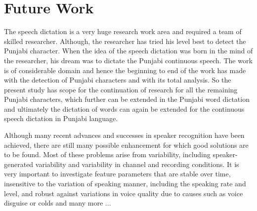 \documentclass[12pt,a4paper,oldfontcommands]{memoir}
\begin{document}
\section{Future Work}

The speech dictation is a very huge research work area and required a team of skilled
researcher. Although, the researcher has tried his level best to detect the Punjabi
character. When the idea of the speech dictation was born in the mind of the
researcher, his dream was to dictate the Punjabi continuous speech. The work is of
considerable domain and hence the beginning to end of the work has made with the
detection of Punjabi characters and with its total analysis. So the present study has scope for the
continuation of research for all the remaining Punjabi characters, which further can
be extended in the Punjabi word dictation and ultimately the dictation of words can
again be extended for the continuous speech dictation in Punjabi language.

Although many recent advances and successes in speaker recognition have been
achieved, there are still many possible enhancement for which good solutions are to
be found. Most of these problems arise from variability, including speaker-generated
variability and variability in channel and recording conditions. It is very important to
investigate feature parameters that are stable over time, insensitive to the variation of
speaking manner, including the speaking rate and level, and robust against variations
in voice quality due to causes such as voice disguise or colds and many more ...












\end{document}

